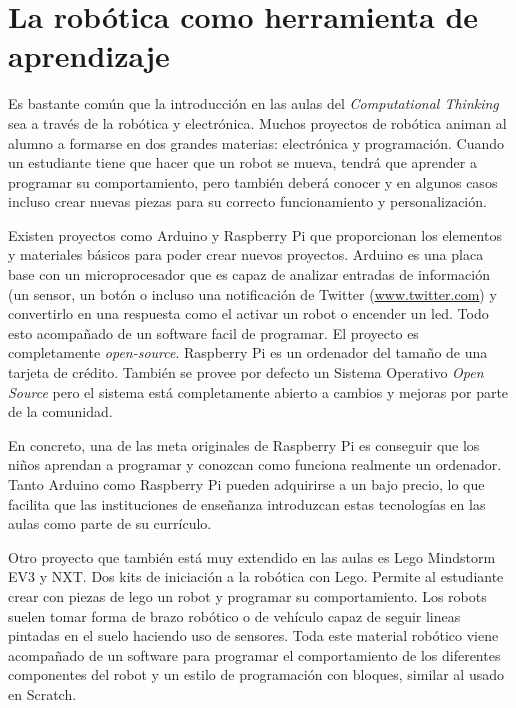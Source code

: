 \section{La robótica como herramienta de aprendizaje}
\label{sec:electronica-robotica}


Es bastante común que la introducción en las aulas del \emph{Computational Thinking} sea a través de la robótica y electrónica. Muchos proyectos de robótica animan al alumno a formarse en dos grandes materias: electrónica y programación. Cuando un estudiante tiene que hacer que un robot se mueva, tendrá que aprender a programar su comportamiento, pero también deberá conocer y en algunos casos incluso crear nuevas piezas para su correcto funcionamiento y personalización.

Existen proyectos como Arduino\cite{arduino} y Raspberry Pi\cite{raspberry-pi} que proporcionan los elementos y materiales básicos para poder crear nuevos proyectos. Arduino es una placa base con un microprocesador que es capaz de analizar entradas de información (un sensor, un botón o incluso una notificación de Twitter (\url{www.twitter.com}) y convertirlo en una respuesta como el activar un robot o encender un led. Todo esto acompañado de un software facil de programar. El proyecto es completamente \emph{\gls{open-source}}. Raspberry Pi es un ordenador del tamaño de una tarjeta de crédito. También se provee por defecto un Sistema Operativo \emph{Open Source} pero el sistema está completamente abierto a cambios y mejoras por parte de la comunidad. 


En concreto, una de las meta originales de Raspberry Pi es conseguir que los niños aprendan a programar y conozcan como funciona realmente un ordenador. Tanto Arduino como Raspberry Pi pueden adquirirse a un bajo precio, lo que facilita que las instituciones de enseñanza introduzcan estas tecnologías en las aulas como parte de su currículo.


Otro proyecto que también está muy extendido en las aulas es Lego Mindstorm EV3 y NXT\cite{lego-mindstorm}. Dos kits de iniciación a la robótica con Lego. Permite al estudiante crear con piezas de lego un robot y programar su comportamiento. Los robots suelen tomar forma de brazo robótico o de vehículo capaz de seguir lineas pintadas en el suelo haciendo uso de sensores. Toda este material robótico viene acompañado de un software para programar el comportamiento de los diferentes componentes del robot y un estilo de programación con bloques\cite{lego-mindstorm-programar}, similar al usado en Scratch.

